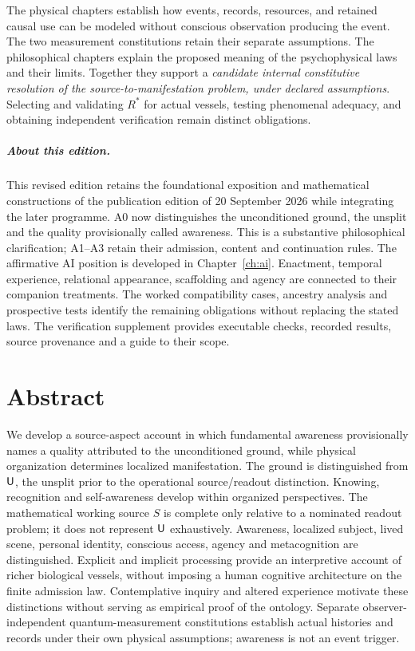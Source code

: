The physical chapters establish how events, records, resources, and retained causal use can be modeled without conscious observation producing the event. The two measurement constitutions retain their separate assumptions. The philosophical chapters explain the proposed meaning of the psychophysical laws and their limits. Together they support a \emph{candidate internal constitutive resolution of the source-to-manifestation problem, under declared assumptions}. Selecting and validating $R^\ast$ for actual vessels, testing phenomenal adequacy, and obtaining independent verification remain distinct obligations.

\paragraph{About this edition.}
This revised edition retains the foundational exposition and mathematical constructions of the publication edition of 20 September 2026 while integrating the later programme. A0 now distinguishes the unconditioned ground, the unsplit and the quality provisionally called awareness. This is a substantive philosophical clarification; A1--A3 retain their admission, content and continuation rules. The affirmative AI position is developed in Chapter~\ref{ch:ai}. Enactment, temporal experience, relational appearance, scaffolding and agency are connected to their companion treatments. The worked compatibility cases, ancestry analysis and prospective tests identify the remaining obligations without replacing the stated laws. The verification supplement provides executable checks, recorded results, source provenance and a guide to their scope.

\normalsize
\chapter*{Abstract}\label{chapter:abstract}
\small
We develop a source-aspect account in which fundamental awareness provisionally names a quality attributed to the unconditioned ground, while physical organization determines localized manifestation. The ground is distinguished from $\mathsf{U}$, the unsplit prior to the operational source/readout distinction. Knowing, recognition and self-awareness develop within organized perspectives. The mathematical working source $S$ is complete only relative to a nominated readout problem; it does not represent $\mathsf{U}$ exhaustively. Awareness, localized subject, lived scene, personal identity, conscious access, agency and metacognition are distinguished. Explicit and implicit processing provide an interpretive account of richer biological vessels, without imposing a human cognitive architecture on the finite admission law. Contemplative inquiry and altered experience motivate these distinctions without serving as empirical proof of the ontology. Separate observer-independent quantum-measurement constitutions establish actual histories and records under their own physical assumptions; awareness is not an event trigger.

